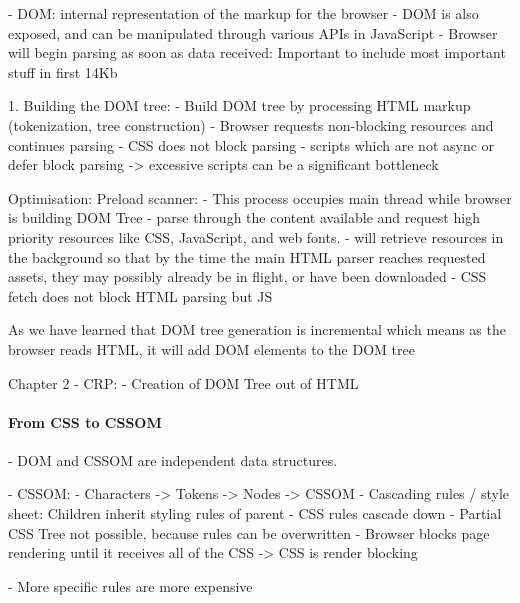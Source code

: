 - DOM: internal representation of the markup for the browser
- DOM is also exposed, and can be manipulated through various APIs in JavaScript
- Browser will begin parsing as soon as data received: Important to include most important stuff in first 14Kb

1. Building the DOM tree:
- Build DOM tree by processing HTML markup (tokenization, tree construction)
- Browser requests non-blocking resources and continues parsing
- CSS does not block parsing
- scripts which are not async or defer block parsing -> excessive scripts can be a significant bottleneck

Optimisation: Preload scanner:
- This process occupies main thread while browser is building DOM Tree
- parse through the content available and request high priority resources like CSS, JavaScript, and web fonts.
- will retrieve resources in the background so that by the time the main HTML parser reaches requested assets, they may possibly already be in flight, or have been downloaded
- CSS fetch does not block HTML parsing but JS



As we have learned that DOM tree generation is incremental which means as the browser reads HTML, it will add DOM elements to the DOM tree


Chapter 2
- CRP:
- Creation of DOM Tree out of HTML




\paragraph{From CSS to CSSOM}



- DOM and CSSOM are independent data structures.

- CSSOM:
	- Characters -> Tokens -> Nodes -> CSSOM
	- Cascading rules / style sheet: Children inherit styling rules of parent
	- CSS rules cascade down
	- Partial CSS Tree not possible, because rules can be overwritten
	- Browser blocks page rendering until it receives all of the CSS
	-> CSS is render blocking

	- More specific rules are more expensive
	
